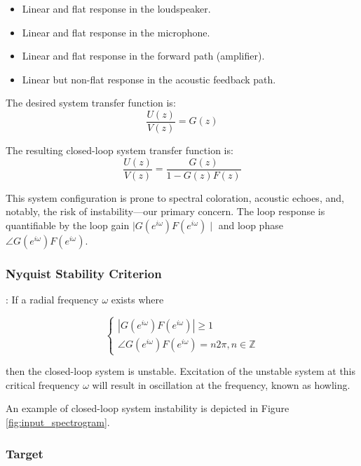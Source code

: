 \begin{itemize}
    \item Linear and flat response in the loudspeaker.
    \item Linear and flat response in the microphone.
    \item Linear and flat response in the forward path (amplifier).
    \item Linear but non-flat response in the acoustic feedback path.
\end{itemize}

The desired system transfer function is:
\begin{equation}
    \frac{U(z)}{V(z)} = G(z)
\end{equation}

The resulting closed-loop system transfer function is:
\begin{equation}
    \frac{U(z)}{V(z)} = \frac{G(z)}{1 - G(z) F(z)}
\end{equation}

This system configuration is prone to spectral coloration, acoustic echoes, and, notably, the risk of instability—our primary concern. The loop response is quantifiable by the loop gain $\mid G(e^{i \omega}) F(e^{i \omega})\mid$ and loop phase $\angle G(e^{i \omega}) F(e^{i \omega})$.

\subsubsection{Nyquist Stability Criterion}:
If a radial frequency $\omega$ exists where

\begin{equation}
    \left\{\begin{array}{l}
    \left|G\left(e^{i \omega}\right) F\left(e^{i \omega}\right)\right| \geq 1 \\
    \angle G\left(e^{i \omega}\right) F\left(e^{i \omega}\right)=n 2 \pi, n \in \mathbb{Z}
    \end{array}\right.
\end{equation}

then the closed-loop system is unstable. Excitation of the unstable system at this critical frequency $\omega$ will result in oscillation at the frequency, known as howling.

An example of closed-loop system instability is depicted in Figure \ref{fig:input_spectrogram}.

\subsubsection{Target}

